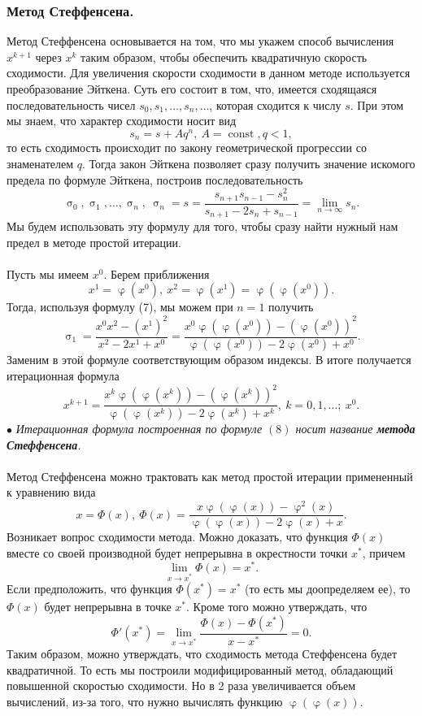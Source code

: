 \documentclass[a4paper, 12pt]{report}
\numberwithin{equation}{section}
\renewcommand{\varphi}{\upvarphi}
\renewcommand{\sigma}{\upsigma}
\begin{document}
\subsubsection{Метод Стеффенсена.}
Метод Стеффенсена основывается на том, что мы укажем способ вычисления $x^{k+1}$ через $x^k$ таким образом, чтобы обеспечить квадратичную скорость сходимости. Для увеличения скорости сходимости в данном методе используется преобразование Эйткена. Суть его состоит в том, что, имеется сходящаяся последовательность чисел $s_0, s_1,\ldots, s_n,\ldots$, которая сходится к числу $s$. При этом мы знаем, что характер сходимости носит вид $$s_n = s + Aq^n,\ A = \operatorname{const}, q < 1,$$ то есть сходимость происходит по закону геометрической прогрессии со знаменателем $q$. Тогда закон Эйткена позволяет сразу получить значение искомого предела по формуле Эйткена, построив последовательность 
\begin{equation}
	\sigma_0,\sigma_1,\ldots,\sigma_n, \ \sigma_n = s = \dfrac{s_{n+1}s_{n-1} - s_n^2}{s_{n+1} - 2s_n + s_{n-1}} = \lim\limits_{n\to\infty} s_n.
\end{equation}
Мы будем использовать эту формулу для того, чтобы сразу найти нужный нам предел в методе простой итерации. \\\\
Пусть мы имеем $x^0$. Берем приближения $$x^1 = \varphi(x^0), \ x^2 = \varphi(x^1) = \varphi(\varphi(x^0)).$$
Тогда, используя формулу (7), мы можем при $n=1$ получить $$\sigma_1 = \dfrac{x^0x^2 - (x^1)^2}{x^2 - 2x^1 +x^0} = \dfrac{x^0 \varphi(\varphi(x^0)) - (\varphi(x^0))^2}{\varphi(\varphi(x^0)) - 2 \varphi(x^0) + x^0}.$$
Заменим в этой формуле соответствующим образом индексы. В итоге получается итерационная формула
\begin{equation}
	x^{k+1} = \dfrac{x^k \varphi(\varphi(x^k)) - (\varphi(x^k))^2}{\varphi(\varphi(x^k)) - 2 \varphi(x^k) + x^k},\ k=0,1,\ldots;\ x^0.
\end{equation}
$\bullet$ \textit{Итерационная формула построенная по формуле $(8)$ носит название \textbf{метода Стеффенсена}.}
\\\\
Метод Стеффенсена можно трактовать как метод простой итерации примененный к уравнению вида $$x = \Phi(x),\ \Phi(x) = \dfrac{x \varphi(\varphi(x)) - \varphi^2(x)}{\varphi(\varphi(x)) - 2\varphi(x) + x}.$$ 
Возникает вопрос сходимости метода.
Можно доказать, что функция $\Phi(x)$ вместе со своей производной будет непрерывна в окрестности точки $x^*$, причем $$\lim\limits_{x\to x^*}\Phi(x) = x^*.$$ Если предположить, что функция $\Phi(x^*) = x^*$ (то есть мы доопределяем ее), то $\Phi(x)$ будет непрерывна в точке $x^*$. Кроме того можно утверждать, что $$\Phi'(x^*) = \lim\limits_{x\to x^*}\dfrac{\Phi(x) - \Phi(x^*)}{x - x^*} = 0.$$
Таким образом, можно утверждать, что сходимость метода Стеффенсена будет квадратичной. То есть мы построили модифицированный метод, обладающий повышенной скоростью сходимости. Но в 2 раза увеличивается объем вычислений, из-за того, что нужно вычислять функцию $\varphi(\varphi(x))$.
\end{document}
